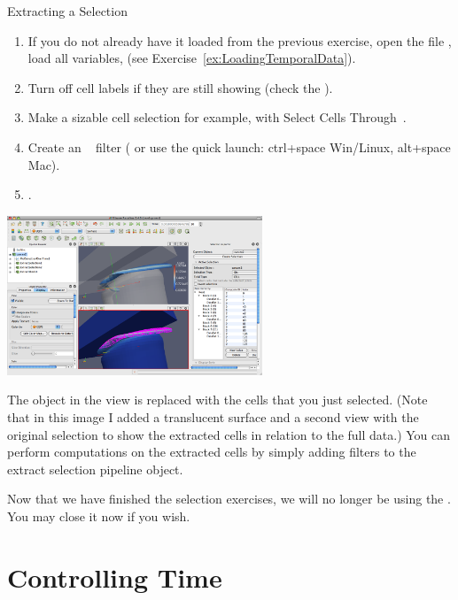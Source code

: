 \begin{exercise}{Extracting a Selection}
  \label{ex:ExtractingASelection}%
  \begin{enumerate}
  \item If you do not already have it loaded from the previous exercise,
    open the file , load all variables, \apply (see
    Exercise~\ref{ex:LoadingTemporalData}).
  \item Turn off cell labels if they are still showing (check the
    ).
  \item Make a sizable cell selection for example, with Select Cells
    Through~\selectCellsThrough.
  \item Create an ~
    filter ( \ra {} \ra {} or use the quick launch: ctrl+space Win/Linux, alt+space
    Mac).  
  \item \apply.
  \end{enumerate}

  \begin{inlinefig}
    \includegraphics[width=3in]{images/ExtractSelection}
  \end{inlinefig}

  The object in the view is replaced with the cells that you just
  selected. (Note that in this image I added a translucent surface and a
  second view with the original selection to show the extracted cells in
  relation to the full data.) You can perform computations on the extracted
  cells by simply adding filters to the extract selection pipeline object.
\end{exercise}

Now that we have finished the selection exercises, we will no longer be
using the .  You may close it now if you wish.


\section{Controlling Time}

